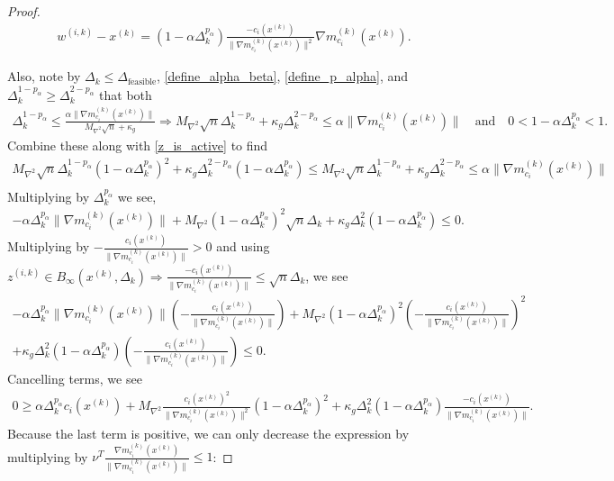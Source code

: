 \documentclass{article}
\theoremstyle{case}
\numberwithin{theorem}{subsection}
\newcommand{\dfeas}{{\Delta_{\textrm{feasible}}}}
\newcommand{\dk}{\Delta_k}
\newcommand{\gmcik}{{\nabla m_{c_i}^{(k)}\left(\xk\right)}}
\newcommand{\maxhessian}{{M_{\nabla^2}}}
\newcommand{\tr}{{ B_{\infty}\left(\xk, \dk\right) }}
\newcommand{\wik}{{w^{(i, k)}}}
\newcommand{\xk}{{x^{(k)}}}
\newcommand{\zik}{{z^{(i, k)}}}
\begin{document}
\begin{proof}
\begin{align}
\wik - \xk = \left(1 - \alpha \dk^{p_{\alpha} }\right)\frac{-c_i(\xk)}{\|\gmcik\|^2}\gmcik. \label{simple_computation}
\end{align}

Also, note by $\dk \le \dfeas$, \cref{define_alpha_beta}, \cref{define_p_alpha}, and $\dk^{1 - p_{\alpha}} \ge \dk^{2 - p_{\alpha}}$ that both
\begin{align*}
\dk^{1-p_{\alpha}} \le \frac{\alpha \|\gmcik\|}{\maxhessian \sqrt{n} + \kappa_g} \Longrightarrow 
\maxhessian \sqrt{n}\dk^{1- p_{\alpha}} + \kappa_g \dk^{2 - p_{\alpha}} \le \alpha \|\gmcik\| \quad \text{and} \quad
0 < 1 - \alpha \dk^{p_{\alpha}} < 1.
\end{align*}
Combine these along with \cref{z_is_active} to find 
\begin{align*}
\maxhessian \sqrt{n}\dk^{1-p_{\alpha}}\left(1 - \alpha \dk^{p_{\alpha}}\right)^2  + \kappa_g \dk^{2 - p_{\alpha}} \left(1 - \alpha \dk^{p_{\alpha}}\right)
\le \maxhessian \sqrt{n}\dk^{1 - p_{\alpha}} + \kappa_g \dk^{2 - p_{\alpha}} \le \alpha \|\gmcik\| \\
\end{align*}
Multiplying by $\dk^{p_{\alpha}}$ we see,
\begin{align*}
-\alpha \dk^{p_{\alpha}}\|\gmcik\| + \maxhessian \left(1 - \alpha \dk^{p_{\alpha}}\right)^2 \sqrt{n}\dk+ \kappa_g \dk^2 \left(1 - \alpha \dk^{p_{\alpha}}\right) \le  0.
\end{align*}
Multiplying by $-\frac{c_i(\xk)}{\|\gmcik\|} > 0$ and using $\zik \in \tr \Longrightarrow \frac{-c_i(\xk)}{\|\gmcik\|} \le \sqrt{n}\dk$, we see
\begin{align*}
-\alpha \dk^{p_{\alpha}}\|\gmcik\|\left(-\frac{c_i(\xk)}{\|\gmcik\|}\right) + \maxhessian \left(1 - \alpha \dk^{p_{\alpha}}\right)^2 \left(-\frac{c_i(\xk)}{\|\gmcik\|}\right)^2\\
+\kappa_g \dk^2 \left(1 - \alpha \dk^{p_{\alpha}}\right)\left(-\frac{c_i(\xk)}{\|\gmcik\|}\right) \le 0.
\end{align*}
Cancelling terms, we see
\begin{align*}
0 \ge \alpha \dk^{p_{\alpha}} c_i(\xk) + \maxhessian \frac {c_i(\xk)^2}{\|\gmcik\|^2}\left(1 - \alpha \dk^{p_{\alpha}}\right)^2 + \kappa_g \dk^2 \left(1 - \alpha \dk^{p_{\alpha}}\right)\frac{-c_i(\xk)}{\|\gmcik\|}.
\end{align*}
Because the last term is positive, we can only decrease the expression by multiplying by $\nu^T \frac{\gmcik}{\|\gmcik\|} \le 1$:

\end{proof}
\end{document}
